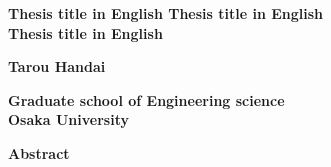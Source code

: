 \begin{center}
  \large{ \textbf{
    Thesis title in English Thesis title in English \\
    Thesis title in English
  }}
\end{center}
\begin{center}
  \large{ \textbf{
    Tarou Handai
  }}
\end{center}
\begin{center}
  \textbf{
    Graduate school of Engineering science\\
    Osaka University
  }
\end{center}
\begin{center}
  \textbf{Abstract}
\end{center}



\lipsum[1-4]

